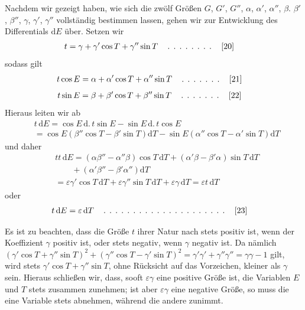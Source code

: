 \begingroup
\renewcommand{\arraystretch}{1.45}

Nachdem wir gezeigt haben, wie sich die zwölf Größen $G$, $G'$, $G''$, $\alpha$, $\alpha'$, $\alpha''$, $\beta$. $\beta'$, $\beta''$, $\gamma$, $\gamma'$, $\gamma''$ vollständig bestimmen lassen, gehen wir zur Entwicklung des Differentials $\mathrm dE$ über. Setzen wir
\[
\begin{aligned}
&t=\gamma+\gamma'\cos T+\gamma''\sin T\quad
\mathinner{\ldotp\;\ldotp\;\ldotp\;\ldotp\;\ldotp\;\ldotp\;\ldotp\;\ldotp}\quad[20]
\end{aligned}
\]
sodass gilt
\[
\begin{aligned}
&t\cos E=\alpha+\alpha'\cos T+\alpha''\sin T\quad
\mathinner{\ldotp\;\ldotp\;\ldotp\;\ldotp\;\ldotp\;\ldotp\;\ldotp}\quad[21]
\end{aligned}
\]
\[
\begin{aligned}
&t\sin E=\beta+\beta'\cos T+\beta''\sin T\quad
\mathinner{\ldotp\;\ldotp\;\ldotp\;\ldotp\;\ldotp\;\ldotp\;\ldotp}\quad[22]
\end{aligned}
\]
Hieraus leiten wir ab
\[
\begin{aligned}
&t\,\mathrm dE=\cos E\,\mathrm d.\,t\sin E-\sin E\,\mathrm d.\,t\cos E\\[8pt]
&=\cos E(\beta''\cos T-\beta'\sin T)\mathrm dT
-\sin E(\alpha''\cos T-\alpha'\sin T)\mathrm dT
\end{aligned}
\]
und daher
\[
\begin{aligned}
&tt\,\mathrm dE=(\alpha\beta''-\alpha''\beta)\cos T\,\mathrm dT
+(\alpha'\beta-\beta'\alpha)\sin T\,\mathrm dT
\\[6pt]
&\qquad{}+(\alpha'\beta''-\beta'\alpha'')\mathrm dT\\[8pt]
&=\varepsilon\gamma'\cos T\,\mathrm dT
+\varepsilon\gamma''\sin T\,\mathrm dT
+\varepsilon\gamma\,\mathrm dT=\varepsilon t\,\mathrm dT
\end{aligned}
\]
oder
\[
\begin{aligned}
&t\,\mathrm dE{}=\varepsilon\,\mathrm dT\quad
\mathinner{\ldotp\;\ldotp\;\ldotp\;\ldotp\;\ldotp\;\ldotp\;\ldotp\;\ldotp\;\ldotp\;\ldotp\;\ldotp\;\ldotp\;\ldotp\;\ldotp\;\ldotp\;\ldotp\;\ldotp\;\ldotp\;\ldotp\;\ldotp\;\ldotp}\quad[23]
\end{aligned}
\]
\par Es ist zu beachten, dass die Größe $t$ ihrer Natur nach stets positiv ist, wenn der Koeffizient $\gamma$ positiv ist, oder stets negativ, wenn $\gamma$ negativ ist. Da nämlich
$(\gamma'\cos T+\gamma''\sin T)^2+(\gamma''\cos T-\gamma'\sin T)^2=\gamma'\gamma'+\gamma''\gamma''=\gamma\gamma-1$ gilt, wird stets
\noindent{}
$\gamma'\cos T+\gamma''\sin T$, ohne Rücksicht auf das Vorzeichen, kleiner als $\gamma$ sein. Hieraus schließen wir, dass, sooft $\varepsilon\gamma$ eine positive Größe ist, die Variablen $E$ und $T$ stets zusammen zunehmen; ist aber $\varepsilon\gamma$ eine negative Größe, so muss die eine Variable stets abnehmen, während die andere zunimmt.

